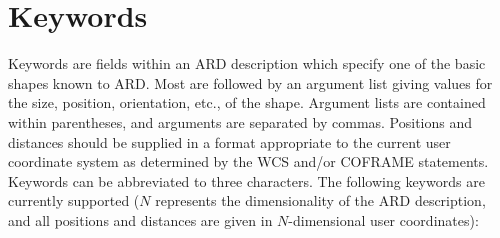 \documentclass[11pt]{starlink}
\begin{document}
\section{\label{SEC:KEYW}Keywords}
Keywords are fields within an ARD description which specify one of the
basic shapes known to ARD. Most are followed by an argument list giving
values for the size, position, orientation, etc., of the shape. Argument
lists are contained within parentheses, and arguments are separated by
commas. Positions and distances should be supplied in a format
appropriate to the current user coordinate system as determined by the
WCS and/or COFRAME statements. Keywords can be abbreviated to three
characters. The following keywords are currently supported ($N$
represents the dimensionality of the ARD description, and all positions
and distances are given in $N$-dimensional user coordinates):
\end{document}
